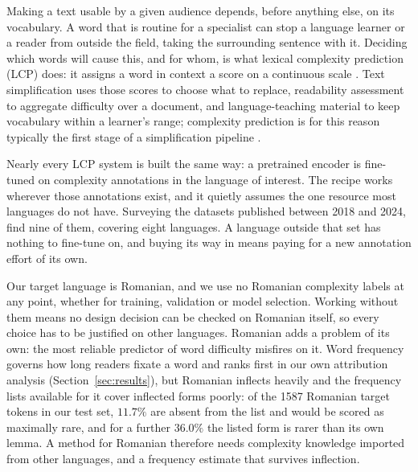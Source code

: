Making a text usable by a given audience depends, before anything else,
on its vocabulary. A word that is routine for a specialist can stop a
language learner or a reader from outside the field, taking the
surrounding sentence with it. Deciding which
words will cause this, and for whom, is what lexical complexity
prediction (LCP) does: it assigns a word in context a score on a
continuous scale \citep{shardlow-etal-2021-semeval}. Text simplification
uses those scores to choose what to replace, readability assessment to
aggregate difficulty over a document, and language-teaching material to
keep vocabulary within a learner's range; complexity prediction is for
this reason typically the first stage of a simplification pipeline
\citep{qiu-etal-2024-complex}.

Nearly every LCP system is built the same way: a pretrained encoder is
fine-tuned on complexity annotations in the language of interest. The
recipe works wherever those annotations exist, and it quietly assumes the
one resource most languages do not have. Surveying the datasets published
between 2018 and 2024, \citet{shardlow-etal-2024-multilingual} find nine
of them, covering eight languages. A language outside that set has
nothing to fine-tune on, and buying its way in means paying for a new
annotation effort of its own.

Our target language is Romanian, and we use no Romanian complexity
labels at any point, whether for training, validation or model
selection. Working without them means no design decision can be checked
on Romanian itself, so every choice has to be justified on other
languages. Romanian adds a problem of its own: the most reliable
predictor of word difficulty misfires on it. Word frequency governs how
long readers fixate a word \citep{rayner1998eye} and ranks first in our
own attribution analysis (Section~\ref{sec:results}), but Romanian
inflects heavily and the frequency lists available for it cover
inflected forms poorly: of the 1587 Romanian target tokens in our test
set, $11.7\%$ are absent from the list and would be scored as maximally
rare, and for a further $36.0\%$ the listed form is rarer than its own
lemma. A method for Romanian therefore needs complexity knowledge
imported from other languages, and a frequency estimate that survives
inflection.

